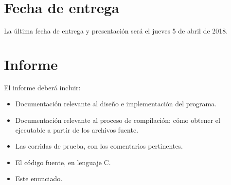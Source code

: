 \section{Fecha de entrega}

La última fecha de entrega y presentación ser\'a el jueves 5 de abril de 2018.
\\
\section{Informe}\label{informe}
El informe deberá incluir:
\begin{itemize}
\item Documentación relevante al diseño e implementación del programa.
\item Documentación relevante al proceso de compilación: cómo obtener el ejecutable a partir de los archivos fuente.
\item Las corridas de prueba, con los comentarios pertinentes.
\item El código fuente, en lenguaje C.
\item Este enunciado.
\end{itemize}
